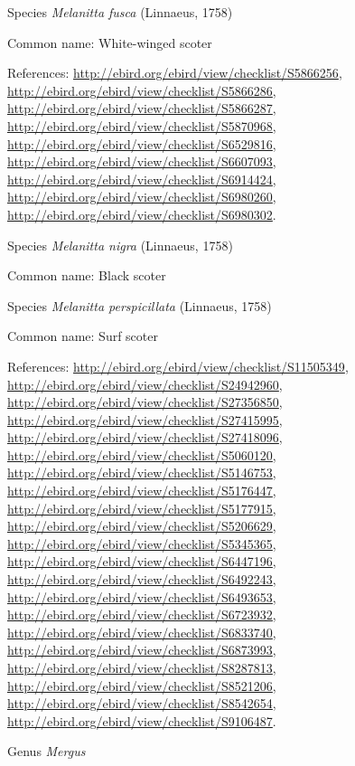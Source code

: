 \documentclass[9pt, article]{memoir}
\begin{document}
\begin{multicols}{2}
\vspace{6pt}\noindent\hspace{36pt}Species \textit{Melanitta fusca} (Linnaeus, 1758)


Common name: White-winged scoter

References: 
\url{http://ebird.org/ebird/view/checklist/S5866256}, 
\url{http://ebird.org/ebird/view/checklist/S5866286}, 
\url{http://ebird.org/ebird/view/checklist/S5866287}, 
\url{http://ebird.org/ebird/view/checklist/S5870968}, 
\url{http://ebird.org/ebird/view/checklist/S6529816}, 
\url{http://ebird.org/ebird/view/checklist/S6607093}, 
\url{http://ebird.org/ebird/view/checklist/S6914424}, 
\url{http://ebird.org/ebird/view/checklist/S6980260}, 
\url{http://ebird.org/ebird/view/checklist/S6980302}.

\vspace{6pt}\noindent\hspace{36pt}Species \textit{Melanitta nigra} (Linnaeus, 1758)


Common name: Black scoter

\vspace{6pt}\noindent\hspace{36pt}Species \textit{Melanitta perspicillata} (Linnaeus, 1758)


Common name: Surf scoter

References: 
\url{http://ebird.org/ebird/view/checklist/S11505349}, 
\url{http://ebird.org/ebird/view/checklist/S24942960}, 
\url{http://ebird.org/ebird/view/checklist/S27356850}, 
\url{http://ebird.org/ebird/view/checklist/S27415995}, 
\url{http://ebird.org/ebird/view/checklist/S27418096}, 
\url{http://ebird.org/ebird/view/checklist/S5060120}, 
\url{http://ebird.org/ebird/view/checklist/S5146753}, 
\url{http://ebird.org/ebird/view/checklist/S5176447}, 
\url{http://ebird.org/ebird/view/checklist/S5177915}, 
\url{http://ebird.org/ebird/view/checklist/S5206629}, 
\url{http://ebird.org/ebird/view/checklist/S5345365}, 
\url{http://ebird.org/ebird/view/checklist/S6447196}, 
\url{http://ebird.org/ebird/view/checklist/S6492243}, 
\url{http://ebird.org/ebird/view/checklist/S6493653}, 
\url{http://ebird.org/ebird/view/checklist/S6723932}, 
\url{http://ebird.org/ebird/view/checklist/S6833740}, 
\url{http://ebird.org/ebird/view/checklist/S6873993}, 
\url{http://ebird.org/ebird/view/checklist/S8287813}, 
\url{http://ebird.org/ebird/view/checklist/S8521206}, 
\url{http://ebird.org/ebird/view/checklist/S8542654}, 
\url{http://ebird.org/ebird/view/checklist/S9106487}.

\vspace{6pt}\noindent\hspace{30pt}Genus \textit{Mergus}



\end{multicols}
\end{document}
